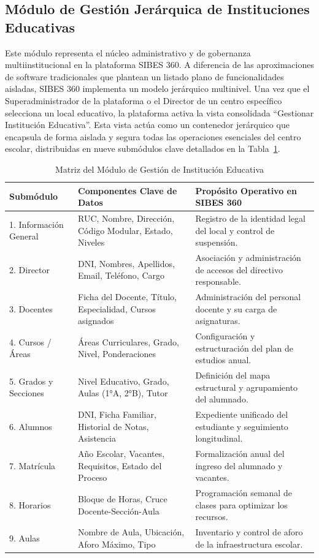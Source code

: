 \documentclass[12pt,a4paper,oneside]{report}
\begin{document}
\subsection{Módulo de Gestión Jerárquica de Instituciones Educativas}
Este módulo representa el núcleo administrativo y de gobernanza multiinstitucional en la plataforma SIBES 360. A diferencia de las aproximaciones de software tradicionales que plantean un listado plano de funcionalidades aisladas, SIBES 360 implementa un modelo jerárquico multinivel. Una vez que el Superadministrador de la plataforma o el Director de un centro específico selecciona un local educativo, la plataforma activa la vista consolidada ``Gestionar Institución Educativa''. Esta vista actúa como un contenedor jerárquico que encapsula de forma aislada y segura todas las operaciones esenciales del centro escolar, distribuidas en nueve submódulos clave detallados en la Tabla~\ref{tab:matriz_gestion_ie}.

\begin{table}[H]
\centering
\caption{Matriz del Módulo de Gestión de Institución Educativa}
\label{tab:matriz_gestion_ie}
\begin{tabularx}{\textwidth}{lXX}
\toprule
\textbf{Submódulo} & \textbf{Componentes Clave de Datos} & \textbf{Propósito Operativo en SIBES 360} \\
\midrule
1. Información General & RUC, Nombre, Dirección, Código Modular, Estado, Niveles & Registro de la identidad legal del local y control de suspensión. \\
2. Director & DNI, Nombres, Apellidos, Email, Teléfono, Cargo & Asociación y administración de accesos del directivo responsable. \\
3. Docentes & Ficha del Docente, Título, Especialidad, Cursos asignados & Administración del personal docente y su carga de asignaturas. \\
4. Cursos / Áreas & Áreas Curriculares, Grado, Nivel, Ponderaciones & Configuración y estructuración del plan de estudios anual. \\
5. Grados y Secciones & Nivel Educativo, Grado, Aulas (1°A, 2°B), Tutor & Definición del mapa estructural y agrupamiento del alumnado. \\
6. Alumnos & DNI, Ficha Familiar, Historial de Notas, Asistencia & Expediente unificado del estudiante y seguimiento longitudinal. \\
7. Matrícula & Año Escolar, Vacantes, Requisitos, Estado del Proceso & Formalización anual del ingreso del alumnado y vacantes. \\
8. Horarios & Bloque de Horas, Cruce Docente-Sección-Aula & Programación semanal de clases para optimizar los recursos. \\
9. Aulas & Nombre de Aula, Ubicación, Aforo Máximo, Tipo & Inventario y control de aforo de la infraestructura escolar. \\
\bottomrule
\end{tabularx}
\end{table}
\end{document}
